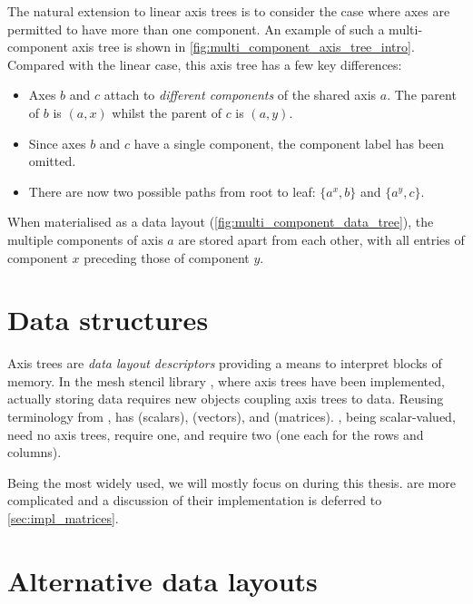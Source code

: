 \documentclass[thesis]{subfiles}
\begin{document}
The natural extension to linear axis trees is to consider the case where axes are permitted to have more than one component.
An example of such a multi-component axis tree is shown in \cref{fig:multi_component_axis_tree_intro}.
Compared with the linear case, this axis tree has a few key differences:
\begin{itemize}
  \item
    Axes $b$ and $c$ attach to \emph{different components} of the shared axis $a$.
    The parent of $b$ is $(a, x)$ whilst the parent of $c$ is $(a, y)$.
  \item
    Since axes $b$ and $c$ have a single component, the component label has been omitted.
  \item
    There are now two possible paths from root to leaf: $\{ a^x, b \}$ and $\{ a^y, c \}$.
\end{itemize}

When materialised as a data layout (\cref{fig:multi_component_data_tree}), the multiple components of axis $a$ are stored apart from each other, with all entries of component $x$ preceding those of component $y$.

\section{Data structures}

Axis trees are \emph{data layout descriptors} providing a means to interpret blocks of memory.
In the mesh stencil library , where axis trees have been implemented, actually storing data requires new objects coupling axis trees to data.
Reusing terminology from ,  has  (scalars),  (vectors), and  (matrices).
, being scalar-valued, need no axis trees,  require one, and  require two (one each for the rows and columns).

Being the most widely used, we will mostly focus on  during this thesis.
 are more complicated and a discussion of their implementation is deferred to \cref{sec:impl_matrices}.

\section{Alternative data layouts}
\label{sec:axis_tree_alternative_layouts}
\end{document}
